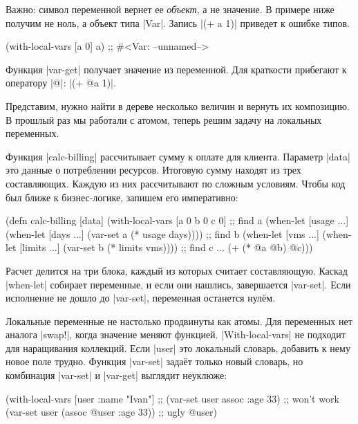 Важно: символ переменной вернет ее \emph{объект}, а не значение. В примере ниже
получим не ноль, а объект типа \spverb|Var|. Запись \spverb|(+ a 1)| приведет к
ошибке типов.

\begin{english}
  \begin{clojure}
(with-local-vars [a 0] a)
;; #<Var: --unnamed-->
  \end{clojure}
\end{english}

Функция \spverb|var-get| получает значение из переменной. Для краткости
прибегают к оператору \spverb|@|: \spverb|(+ @a 1)|.

Представим, нужно найти в дереве несколько величин и вернуть их композицию. В
прошлый раз мы работали с атомом, теперь решим задачу на локальных переменных.

Функция \spverb|calc-billing| рассчитывает сумму к оплате для клиента. Параметр
\spverb|data| это данные о потреблении ресурсов. Итоговую сумму находят из трех
составляющих. Каждую из них рассчитывают по сложным условиям. Чтобы код был
ближе к бизнес-логике, запишем его императивно:

\begin{english}
  \begin{clojure}
(defn calc-billing [data]
  (with-local-vars
    [a 0 b 0 c 0]
    ;; find a
    (when-let [usage ...]
      (when-let [days ...]
        (var-set a (* usage days))))
    ;; find b
    (when-let [vms ...]
      (when-let [limits ...]
        (var-set b (* limits vms))))
    ;; find c ...
    (+ (* @a @b) @c)))
  \end{clojure}
\end{english}

Расчет делится на три блока, каждый из которых считает составляющую. Каскад
\spverb|when-let| собирает переменные, и если они нашлись, завершается
\spverb|var-set|. Если исполнение не дошло до \spverb|var-set|, переменная
останется нул\"{е}м.

Локальные переменные не настолько продвинуты как атомы. Для переменных нет
аналога \spverb|swap!|, когда значение меняют функцией. \spverb|With-local-vars|
не подходит для наращивания коллекций. Если \spverb|user| это локальный словарь,
добавить к нему новое поле трудно. Функция \spverb|var-set| зада\"{е}т только
новый словарь, но комбинация \spverb|var-set| и \spverb|var-get| выглядит
неуклюже:

\begin{english}
  \begin{clojure}
(with-local-vars [user {:name "Ivan"}]
  ;; (var-set user assoc :age 33) ;; won't work
  (var-set user (assoc @user :age 33)) ;; ugly
  @user)
  \end{clojure}
\end{english}

